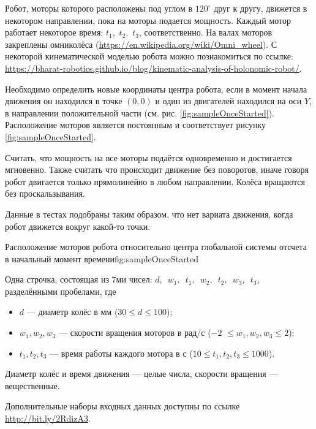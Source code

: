 
Робот, моторы которого расположены под углом в $120^{\circ}$ друг к другу,
движется в некотором направлении, пока на моторы подается мощность.
Каждый мотор работает некоторое время: $t_1$,~$t_2$,~$t_3$, соответственно.
На валах моторов закреплены омниколёса (\url{https://en.wikipedia.org/wiki/Omni_wheel}).
С некоторой кинематической моделью робота можно познакомиться по ссылке:
\url{https://bharat-robotics.github.io/blog/kinematic-analysis-of-holonomic-robot/}.

Необходимо определить новые координаты центра робота, если в момент начала движения он находился в точке
$(0,0)$ и один из двигателей находился на оси $Y$, в направлении положительной части (см. рис. \ref{fig:sampleOnceStarted}).
Расположение моторов является постоянным и соответствует рисунку \ref{fig:sampleOnceStarted}.

Считать, что мощность на все моторы подаётся одновременно и достигается мгновенно.
Также считать что происходит движение без поворотов,
иначе говоря робот двигается только прямолинейно в любом направлении.
Колёса вращаются без проскальзывания.

Данные в тестах подобраны таким образом, что нет вариата движения, когда робот движется вокруг какой-то точки.


{Расположение моторов робота относительно центра глобальной системы отсчета в начальный момент времени}{fig:sampleOnceStarted}



Одна строчка, состоящая из 7ми чисел: $d,$~$w_1,$~$t_1,$~$w_2,$~$t_2,$~$w_3,$~$t_3$, разделёнными пробелами, где
\begin{itemize}
    \item $d$ --- диаметр колёс в мм ($30 \leq d \leq 100$);
    \item $w_1, w_2, w_3$ --- скорости вращения моторов в рад/с ($-2$ $\leq w_1, w_2, w_3 \leq 2$);
    \item $t_1, t_2, t_3$ --- время работы каждого мотора в с ($10 \leq t_1, t_2, t_3 \leq 1000$).
\end{itemize}

Диаметр колёс и время движения --- целые числа, скорости вращения --- вещественные.

\commentsSection

Дополнительные наборы входных данных доступны по ссылке \url{http://bit.ly/2RdizA3}.

